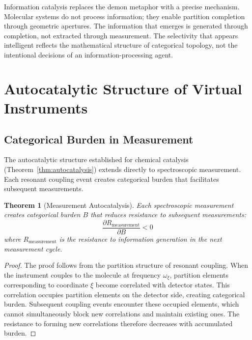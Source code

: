 \documentclass[twocolumn,10pt,a4paper]{article}
\newtheorem{theorem}{Theorem}[section]
\theoremstyle{definition}
\theoremstyle{remark}
\begin{document}
Information catalysis replaces the demon metaphor with a precise mechanism. Molecular systems do not process information; they enable partition completion through geometric apertures. The information that emerges is generated through completion, not extracted through measurement. The selectivity that appears intelligent reflects the mathematical structure of categorical topology, not the intentional decisions of an information-processing agent.

\section{Autocatalytic Structure of Virtual Instruments}
\label{sec:autocatalytic}

\subsection{Categorical Burden in Measurement}

The autocatalytic structure established for chemical catalysis (Theorem~\ref{thm:autocatalysis}) extends directly to spectroscopic measurement. Each resonant coupling event creates categorical burden that facilitates subsequent measurements.

\begin{theorem}[Measurement Autocatalysis]
\label{thm:measurement_autocatalysis}
Each spectroscopic measurement creates categorical burden $B$ that reduces resistance to subsequent measurements:
\begin{equation}
\frac{\partial R_{\mathrm{measurement}}}{\partial B} < 0
\end{equation}
where $R_{\mathrm{measurement}}$ is the resistance to information generation in the next measurement cycle.
\end{theorem}

\begin{proof}
The proof follows from the partition structure of resonant coupling. When the instrument couples to the molecule at frequency $\omega_\xi$, partition elements corresponding to coordinate $\xi$ become correlated with detector states. This correlation occupies partition elements on the detector side, creating categorical burden. Subsequent coupling events encounter these occupied elements, which cannot simultaneously block new correlations and maintain existing ones. The resistance to forming new correlations therefore decreases with accumulated burden.
\end{proof}
\end{document}
